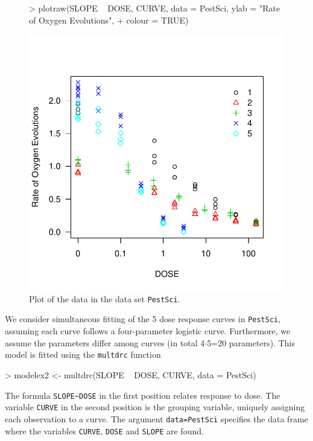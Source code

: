 \documentclass[a4paper]{article}
\begin{document}
\begin{figure}[!htbp]
\begin{center}

\begin{Schunk}
\begin{Sinput}
> plotraw(SLOPE ~ DOSE, CURVE, data = PestSci, ylab = "Rate of Oxygen Evolutions", 
+     colour = TRUE)
\end{Sinput}
\end{Schunk}
\includegraphics{drc-sec5-plot1}
\caption{Plot of the data in the data set \texttt{PestSci}.} \label{sec5-plot1}
\end{center}
\end{figure}

We consider simultaneous fitting of the 5 dose response curves in \verb+PestSci+, assuming each curve follows a four-parameter
logistic curve. Furthermore, we assume the parameters differ among curves (in total 4$\cdot$5=20 parameters).
This model is fitted using the \verb+multdrc+ function

\begin{Schunk}
\begin{Sinput}
> modelex2 <- multdrc(SLOPE ~ DOSE, CURVE, data = PestSci)
\end{Sinput}
\end{Schunk}
The formula \verb+SLOPE~DOSE+ in the first position relates response to dose. The variable \verb+CURVE+ in the second position is the grouping variable,
uniquely assigning each observation to a curve.
The argument \verb+data=PestSci+ specifies the data frame where the variables \verb+CURVE+, \verb+DOSE+ and \verb+SLOPE+ are found.
\end{document}
